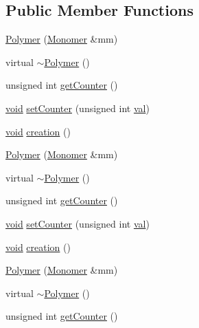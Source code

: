 \subsection*{Public Member Functions}
\begin{DoxyCompactItemize}
\item 
\mbox{\hyperlink{class_polymer_ae77454a3908652e4df6a26b9cac509a5}{Polymer}} (\mbox{\hyperlink{class_monomer}{Monomer}} \&mm)
\item 
virtual \mbox{\hyperlink{class_polymer_aac2b3983f375a5691c7d5ca1a79594d5}{$\sim$\+Polymer}} ()
\item 
unsigned int \mbox{\hyperlink{class_polymer_a8346d821e5f8690d7816ba1d40036b69}{get\+Counter}} ()
\item 
\mbox{\hyperlink{glad_8h_a950fc91edb4504f62f1c577bf4727c29}{void}} \mbox{\hyperlink{class_polymer_a7ed6bbe09a570b59f9253d63fd3326d2}{set\+Counter}} (unsigned int \mbox{\hyperlink{glad_8h_a26942fd2ed566ef553eae82d2c109c8f}{val}})
\item 
\mbox{\hyperlink{glad_8h_a950fc91edb4504f62f1c577bf4727c29}{void}} \mbox{\hyperlink{class_polymer_a1daba3eb2ba8428bf2f3e814668b155f}{creation}} ()
\item 
\mbox{\hyperlink{class_polymer_ae77454a3908652e4df6a26b9cac509a5}{Polymer}} (\mbox{\hyperlink{class_monomer}{Monomer}} \&mm)
\item 
virtual \mbox{\hyperlink{class_polymer_aac2b3983f375a5691c7d5ca1a79594d5}{$\sim$\+Polymer}} ()
\item 
unsigned int \mbox{\hyperlink{class_polymer_a8346d821e5f8690d7816ba1d40036b69}{get\+Counter}} ()
\item 
\mbox{\hyperlink{glad_8h_a950fc91edb4504f62f1c577bf4727c29}{void}} \mbox{\hyperlink{class_polymer_a7ed6bbe09a570b59f9253d63fd3326d2}{set\+Counter}} (unsigned int \mbox{\hyperlink{glad_8h_a26942fd2ed566ef553eae82d2c109c8f}{val}})
\item 
\mbox{\hyperlink{glad_8h_a950fc91edb4504f62f1c577bf4727c29}{void}} \mbox{\hyperlink{class_polymer_a1daba3eb2ba8428bf2f3e814668b155f}{creation}} ()
\item 
\mbox{\hyperlink{class_polymer_ae77454a3908652e4df6a26b9cac509a5}{Polymer}} (\mbox{\hyperlink{class_monomer}{Monomer}} \&mm)
\item 
virtual \mbox{\hyperlink{class_polymer_aac2b3983f375a5691c7d5ca1a79594d5}{$\sim$\+Polymer}} ()
\item 
unsigned int \mbox{\hyperlink{class_polymer_a8346d821e5f8690d7816ba1d40036b69}{get\+Counter}} ()
\item 

\end{DoxyCompactItemize}
